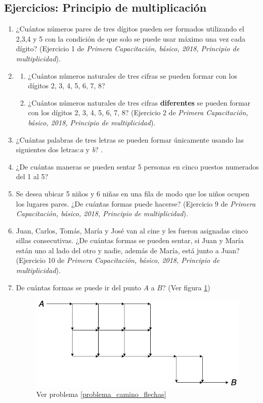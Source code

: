 \newpage
\begin{center}
	\vspace{-1cm}
	\section{ Ejercicios: Principio de multiplicación}\label{ejercicios:combinatoria:contandoListasDeNumeros}
\end{center}	
\begin{enumerate}
	\item ¿Cuántos números pares de tres dígitos pueden ser formados utilizando el 2,3,4 y 5 con la condición de que solo se puede usar máximo una vez cada dígito? (Ejercicio 1 de \textit{Primera Capacitación, básico, 2018, Principio de multiplicidad}).
	\item 
	\begin{enumerate}
		\item ¿Cuántos números naturales de tres cifras se pueden formar con los dígitos 2, 3, 4, 5, 6, 7, 8?
		\item ¿Cuántos números naturales de tres cifras \textbf{diferentes} se pueden formar con los dígitos 2, 3, 4, 5, 6, 7, 8? (Ejercicio 2 de \textit{Primera Capacitación, básico, 2018, Principio de multiplicidad}).
	\end{enumerate}
	\item ¿Cuántas palabras de tres letras se pueden formar únicamente usando las siguientes dos letras:\textit{a} y \textit{b}? .
	\item ¿De cuántas maneras se pueden sentar 5 personas en cinco puestos numerados del 1 al 5?
	\item Se desea ubicar 5 niños y 6 niñas en una fila de modo que los niños ocupen los lugares pares. ¿De cuántas formas puede hacerse? (Ejercicio 9 de \textit{Primera Capacitación, básico, 2018, Principio de multiplicidad}).
	\item Juan, Carlos, Tomás, María y José van al cine y les fueron asignadas cinco sillas consecutivas. ¿De cuántas formas se pueden sentar, si Juan y María están uno al lado del otro y nadie, además de María, está junto a Juan? (Ejercicio 10 de \textit{Primera Capacitación, básico, 2018, Principio de multiplicidad}).
	\item \label{problema_camino_flechas} De cuántas formas se puede ir del punto $A$ a $B$? (Ver figura \ref{problema7principiomultiplicacion})
	
	\begin{figure}[b]
		\centering
		\includegraphics[width=0.7\linewidth]{Combinatoria/imgs/problema7Principiomultiplicacion}
		\caption{Ver problema \ref{problema_camino_flechas}}
		\label{problema7principiomultiplicacion}
	\end{figure}
	

\end{enumerate}
